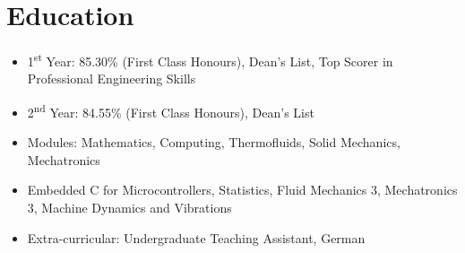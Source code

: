 \documentclass{cv}
\begin{document}
\section{Education}
\begin{subsections}
    \subtitle{MEng Mechanical Engineering \hfill London, United Kingdom}
    \begin{itemize}
        \item 1\textsuperscript{st} Year: 85.30\% (First Class Honours), Dean's List, Top Scorer in Professional Engineering Skills
        \item 2\textsuperscript{nd} Year: 84.55\% (First Class Honours), Dean's List
        \item Modules: Mathematics, Computing, Thermofluids, Solid Mechanics, Mechatronics
        \item Embedded C for Microcontrollers, Statistics, Fluid Mechanics 3, Mechatronics 3, Machine Dynamics and Vibrations
        \item Extra-curricular: Undergraduate Teaching Assistant, German
    \end{itemize}
\end{subsections}
\end{document}
